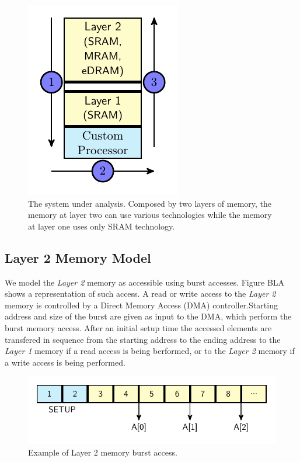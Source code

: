 \begin{figure}[tb] 
\centering
\includegraphics[width=0.5\columnwidth]{images/architecture.pdf}
\caption{\small The system under analysis. Composed by two layers of memory, the memory at layer two can use various technologies while the memory at layer one uses only SRAM technology.}
\label{fig:system}
\end{figure}

\subsection{Layer 2 Memory Model}
We model the \textit{Layer 2} memory as accessible using burst accesses. Figure BLA shows a representation of such access. A read or write access to the \textit{Layer 2} memory is controlled by a Direct Memory Access (DMA) controller.Starting address and size of the burst are given as input to the DMA, which perform the burst memory access. After an initial setup time the accessed elements are transfered in sequence from the starting address to the ending address to the \textit{Layer 1} memory if a read access is being berformed, or to the \textit{Layer 2} memory if a write access is being performed.

\begin{figure}[tb] 
\centering
\includegraphics[width=\columnwidth]{images/l2_model.pdf}
\caption{\small Example of Layer 2 memory burst access.}
\label{fig:l2model}
\end{figure}
